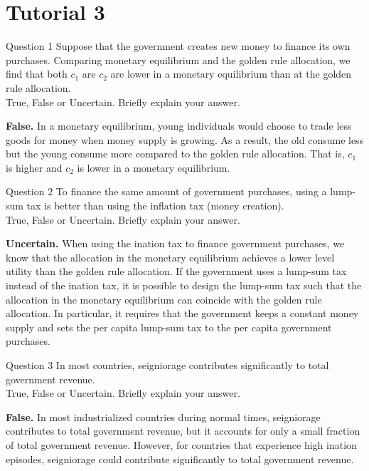 \documentclass[a4paper]{article}
\newif\IfInSansMode
\numberwithin{equation}{section}
\numberwithin{figure}{section}
\begin{document}
\section{Tutorial 3}
	\begin{questionbox}{Question 1}
		Suppose that the government creates new money to finance its own purchases. Comparing monetary equilibrium and the golden rule allocation, we find that both \( c_1 \) are \( c_2 \) are lower in a monetary equilibrium than at the golden rule allocation.\\
		True, False or Uncertain. Briefly explain your answer.
		\begin{explanationbox}
			\textbf{False.} In a monetary equilibrium, young individuals would choose to trade less goods for money when money supply is growing. As a result, the old consume less but the young consume more compared to the golden rule allocation. That is, \( c_1 \) is higher and \( c_2 \) is lower in a monetary equilibrium.
		\end{explanationbox}
	\end{questionbox}
	\begin{questionbox}{Question 2}
		To finance the same amount of government purchases, using a lump-sum tax is better than using the inflation tax (money creation).\\
		True, False or Uncertain. Briefly explain your answer.
		\begin{explanationbox}
			\textbf{Uncertain.} When using the ination tax to finance government purchases, we know that the allocation in the monetary equilibrium achieves a lower level utility than the golden rule allocation. If the government uses a lump-sum tax instead of the ination tax, it is possible to design the lump-sum tax such that the allocation in the monetary equilibrium can coincide with the golden rule allocation. In particular, it requires that the government keeps a constant money supply and sets the per capita lump-sum tax to the per capita government purchases.
		\end{explanationbox}
	\end{questionbox}
	\begin{questionbox}{Question 3}
		In most countries, seigniorage contributes significantly to total government revenue.\\
		True, False or Uncertain. Briefly explain your answer.
		\begin{explanationbox}
			\textbf{False.} In most industrialized countries during normal times, seigniorage contributes to total government revenue, but it accounts for only a small fraction of total government revenue. However, for countries that experience high ination episodes, seigniorage could contribute significantly to total government revenue.
		\end{explanationbox}
	\end{questionbox}
\end{document}
